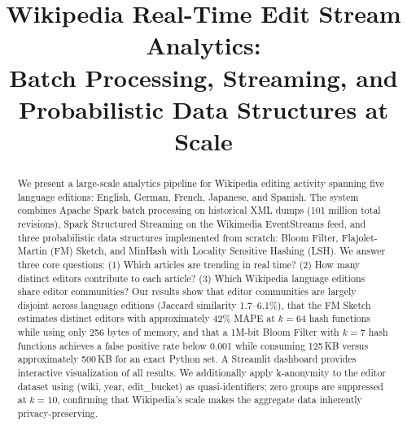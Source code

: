 \documentclass[conference]{IEEEtran}
\begin{document}
\title{Wikipedia Real-Time Edit Stream Analytics:\\
Batch Processing, Streaming, and Probabilistic Data Structures at Scale}

\author{
  \and
  \and
  \and
  \and
}

\maketitle


\begin{abstract}
We present a large-scale analytics pipeline for Wikipedia editing activity spanning five language editions: English, German, French, Japanese, and Spanish. The system combines Apache Spark batch processing on historical XML dumps (101 million total revisions), Spark Structured Streaming on the Wikimedia EventStreams feed, and three probabilistic data structures implemented from scratch: Bloom Filter, Flajolet-Martin (FM) Sketch, and MinHash with Locality Sensitive Hashing (LSH). We answer three core questions: (1) Which articles are trending in real time? (2) How many distinct editors contribute to each article? (3) Which Wikipedia language editions share editor communities? Our results show that editor communities are largely disjoint across language editions (Jaccard similarity 1.7--6.1\%), that the FM Sketch estimates distinct editors with approximately 42\% MAPE at $k=64$ hash functions while using only 256 bytes of memory, and that a 1M-bit Bloom Filter with $k=7$ hash functions achieves a false positive rate below 0.001 while consuming 125\,KB versus approximately 500\,KB for an exact Python set. A Streamlit dashboard provides interactive visualization of all results. We additionally apply k-anonymity to the editor dataset using (wiki, year, edit\_bucket) as quasi-identifiers; zero groups are suppressed at $k=10$, confirming that Wikipedia's scale makes the aggregate data inherently privacy-preserving.
\end{abstract}
\end{document}
